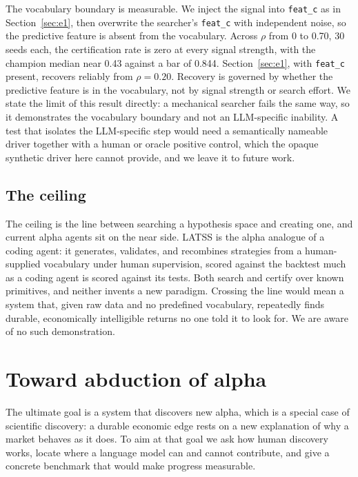 \documentclass[11pt]{article}
\newcommand{\code}[1]{\texttt{#1}}
\begin{document}
The vocabulary boundary is measurable. We inject the signal into \code{feat\_c} as in
Section~\ref{sec:e1}, then overwrite the searcher's \code{feat\_c} with independent noise, so the
predictive feature is absent from the vocabulary. Across $\rho$ from 0 to 0.70, 30 seeds each, the
certification rate is zero at every signal strength, with the champion median near 0.43 against a bar
of 0.844. Section~\ref{sec:e1}, with \code{feat\_c} present, recovers reliably from $\rho=0.20$.
Recovery is governed by whether the predictive feature is in the vocabulary, not by signal strength
or search effort. We state the limit of this result directly: a mechanical searcher fails the same
way, so it demonstrates the vocabulary boundary and not an LLM-specific inability. A test that
isolates the LLM-specific step would need a semantically nameable driver together with a human or
oracle positive control, which the opaque synthetic driver here cannot provide, and we leave it to
future work.

\subsection{The ceiling}

The ceiling is the line between searching a hypothesis space and creating one, and current alpha
agents sit on the near side. LATSS is the alpha analogue of a coding agent: it generates, validates,
and recombines strategies from a human-supplied vocabulary under human supervision, scored against
the backtest much as a coding agent is scored against its tests. Both search and certify over known
primitives, and neither invents a new paradigm. Crossing the line would mean a system that, given raw
data and no predefined vocabulary, repeatedly finds durable, economically intelligible returns no one
told it to look for. We are aware of no such demonstration.

\section{Toward abduction of alpha}
\label{sec:abduction}

The ultimate goal is a system that discovers new alpha, which is a special case of scientific
discovery: a durable economic edge rests on a new explanation of why a market behaves as it does. To
aim at that goal we ask how human discovery works, locate where a language model can and cannot
contribute, and give a concrete benchmark that would make progress measurable.
\end{document}
